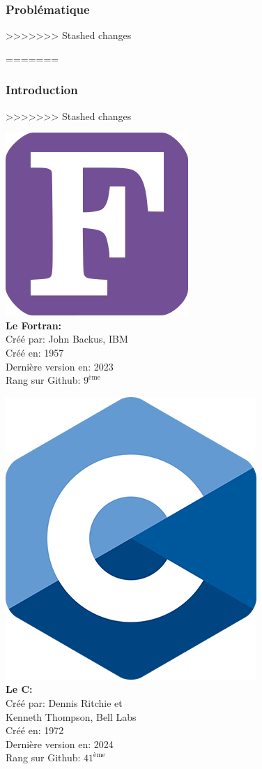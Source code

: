 \documentclass[compress]{beamer} %
\begin{document}
\begin{frame}
    \frametitle{Problématique\esp}
>>>>>>> Stashed changes
    
	\vspace*{0.5cm}
=======
    \frametitle{Introduction\esp}
>>>>>>> Stashed changes

    \begin{minipage}[t]{0.48\textwidth}
        \includegraphics[scale=0.05]{static/Fortran_logo.svg.png}\\
        \textbf{Le Fortran:}\\ 
        Créé par:  John Backus, IBM\\
        Créé en:   1957\\
        Dernière version en: 2023\\
        Rang sur Github: $9^{\text{ème}}$
    \end{minipage}
    \hspace*{0.2cm}
    \begin{minipage}[t]{0.48\textwidth}
        \includegraphics[scale=0.05]{static/C_logo.png}\\
        \textbf{Le C:}\\
        Créé par: Dennis Ritchie et \\Kenneth Thompson, Bell Labs\\
        Créé en:  1972\\
        Dernière version en: 2024\\
        Rang sur Github: $41^{\text{ème}}$



\end{minipage}
\end{frame}
\end{document}
